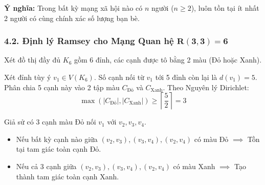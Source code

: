 \documentclass[12pt,a4paper]{article}
\theoremstyle{definition}
\begin{document}
\noindent\textbf{Ý nghĩa:} Trong bất kỳ mạng xã hội nào có $n$ người ($n \ge 2$), luôn tồn tại ít nhất 2 người có cùng chính xác số lượng bạn bè.

\subsubsection*{4.2. Định lý Ramsey cho Mạng Quan hệ $\mathbf{R(3,3)=6}$}
Xét đồ thị đầy đủ $K_6$ gồm 6 đỉnh, các cạnh được tô bằng 2 màu (Đỏ hoặc Xanh).

\noindent Xét đỉnh tùy ý $v_1 \in V(K_6)$. Số cạnh nối từ $v_1$ tới 5 đỉnh còn lại là $d(v_1) = 5$. Phân chia 5 cạnh này vào 2 tập màu $C_{\text{Đỏ}}$ và $C_{\text{Xanh}}$. Theo Nguyên lý Dirichlet:
\[
\max(|C_{\text{Đỏ}}|, |C_{\text{Xanh}}|) \ge \left\lceil \frac{5}{2} \right\rceil = 3
\]

\begin{center}
\end{center}

\noindent Giả sử có 3 cạnh màu Đỏ nối $v_1$ với $v_2, v_3, v_4$.
\begin{itemize}
    \item Nếu bất kỳ cạnh nào giữa $(v_2,v_3), (v_3,v_4), (v_2,v_4)$ có màu Đỏ $\implies$ Tồn tại tam giác toàn cạnh Đỏ.
    \item Nếu cả 3 cạnh giữa $(v_2,v_3), (v_3,v_4), (v_2,v_4)$ có màu Xanh $\implies$ Tạo thành tam giác toàn cạnh Xanh.
\end{itemize}
\end{document}

